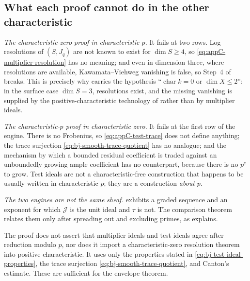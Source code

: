 \subsection{What each proof cannot do in the other characteristic}
\label{sec:ch40-comparison-obstructions}

\emph{The characteristic-zero proof in characteristic $p$.}  It fails at
two rows.  Log resolutions of $(S,J_q)$ are not known to exist for
$\dim S\ge4$, so \eqref{eq:appC-multiplier-resolution} has no meaning; and
even in dimension three, where resolutions are available, Kawamata--Viehweg
vanishing is false, so Step~4 of
 breaks.  This is precisely
why  carries the hypothesis
``$\operatorname{char}k=0$ or $\dim X\le2$'': in the surface case
$\dim S=3$, resolutions exist, and the missing vanishing is supplied by
the positive-characteristic technology of \cite{GJKM19} rather than by
multiplier ideals.

\emph{The characteristic-$p$ proof in characteristic zero.}  It fails at
the first row of the engine.  There is no Frobenius, so
\eqref{eq:appC-test-trace} does not define anything; the trace surjection
\eqref{eq:bj-smooth-trace-quotient} has no analogue; and the mechanism by
which a bounded residual coefficient is traded against an unboundedly
growing ample coefficient has no counterpart, because there is no
$p^e$ to grow.  Test ideals are not a characteristic-free construction
that happens to be usually written in characteristic $p$; they are a
construction \emph{about} $p$.

\emph{The two engines are not the same sheaf.}   exhibits
a graded sequence and an exponent for which
$\mathcal J$ is the unit ideal and $\tau$ is not.  The comparison
theorem  relates them only after spreading out
and excluding primes, as  explains.

\begin{remark}
\label{rem:ch40-multiplier-versus-test}
The proof does not assert that multiplier ideals and test ideals agree
after reduction modulo $p$, nor does it import a characteristic-zero
resolution theorem into positive characteristic.  It uses only the
properties stated in \eqref{eq:bj-test-ideal-properties}, the trace
surjection \eqref{eq:bj-smooth-trace-quotient}, and Canton's estimate.
These are sufficient for the envelope theorem.
\end{remark}

